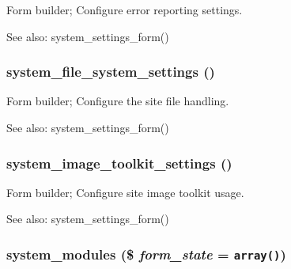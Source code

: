 Form builder; Configure error reporting settings.

\begin{Desc}
\item[See also:]system\_\-settings\_\-form() \end{Desc}
\hypertarget{group__forms_gb0199bde08bcb49ff536dd4987718632}{
\subsubsection[{system\_\-file\_\-system\_\-settings}]{\setlength{\rightskip}{0pt plus 5cm}system\_\-file\_\-system\_\-settings ()}}
\label{group__forms_gb0199bde08bcb49ff536dd4987718632}


Form builder; Configure the site file handling.

\begin{Desc}
\item[See also:]system\_\-settings\_\-form() \end{Desc}
\hypertarget{group__forms_gefe85833f426aa428f4ac75d641d7631}{
\subsubsection[{system\_\-image\_\-toolkit\_\-settings}]{\setlength{\rightskip}{0pt plus 5cm}system\_\-image\_\-toolkit\_\-settings ()}}
\label{group__forms_gefe85833f426aa428f4ac75d641d7631}


Form builder; Configure site image toolkit usage.

\begin{Desc}
\item[See also:]system\_\-settings\_\-form() \end{Desc}
\hypertarget{group__forms_gc1f714517f9c92ec183a05d6f07ccdf1}{
\subsubsection[{system\_\-modules}]{\setlength{\rightskip}{0pt plus 5cm}system\_\-modules (\$ {\em form\_\-state} = {\tt array()})}}
\label{group__forms_gc1f714517f9c92ec183a05d6f07ccdf1}


